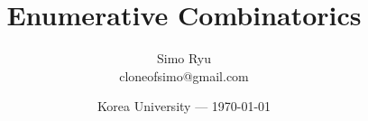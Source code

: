 \documentclass[12pt]{article}
\title{Enumerative Combinatorics}
\author{Simo Ryu \\ cloneofsimo@gmail.com}
\date{Korea University --- \today}
\begin{document}
\maketitle

\section{}
\end{document}

